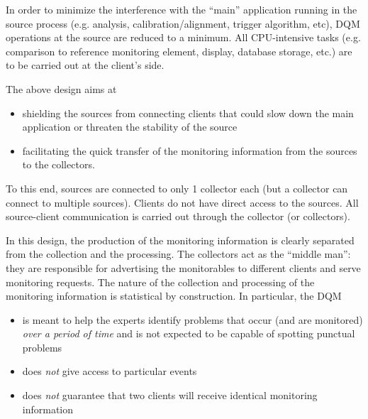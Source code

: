 \documentclass[a4paper]{cmspaper}
\begin{document}
In order to minimize the interference with the ``main'' application
running in the source process (e.g. analysis, calibration/alignment, trigger
algorithm, etc), DQM operations at the source are reduced to a
minimum. All CPU-intensive tasks (e.g.
comparison to reference monitoring element, display, database storage,
etc.) are to be carried out at the client's side.

The above design aims at
\begin{itemize}
\item{shielding the sources from connecting clients
that could slow down the main application or threaten the stability of
the source}
\item{facilitating the quick
transfer of the monitoring information from the sources to the collectors.}
\end{itemize}
To this end, sources are connected to only 1 collector each
(but a collector can connect to multiple sources). Clients do not have
direct access to the sources. All source-client communication is carried out
through the collector (or collectors).

In this design, the production of the monitoring information is clearly
separated from the collection and the processing. The collectors act as
the ``middle man'': they are responsible for advertising the monitorables
to different clients and serve monitoring requests.
The nature of the collection and processing of the monitoring
information is statistical by construction. In particular, the DQM
\begin{itemize}
\item{is meant to help the experts identify problems that occur (and are monitored)
\emph{over a period of time} and is not expected to be capable of spotting
punctual problems}
\item{does \emph{not} give
access to particular events}
\item{does \emph{not} guarantee that two clients
will receive identical monitoring information}
\end{itemize}
%
%
\end{document}
